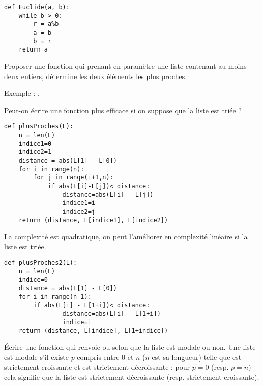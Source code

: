 \begin{Answer}
\begin{lstlisting}
def Euclide(a, b):
    while b > 0:
        r = a%b
        a = b
        b = r
    return a
\end{lstlisting}
\end{Answer}
\begin{Exercise}
Proposer une fonction qui prenant en paramètre une liste contenant au moins deux entiers, détermine les deux éléments les plus proches.  

Exemple : .

Peut-on écrire une fonction plus efficace si on suppose que la liste est triée ?
\end{Exercise}
\begin{Answer}
\begin{lstlisting}
def plusProches(L):
    n = len(L)
    indice1=0
    indice2=1
    distance = abs(L[1] - L[0])
    for i in range(n):
        for j in range(i+1,n):
            if abs(L[i]-L[j])< distance:
                distance=abs(L[i] - L[j])
                indice1=i
                indice2=j
    return (distance, L[indice1], L[indice2])
\end{lstlisting}
    
La complexité est quadratique, on peut l'améliorer en complexité linéaire si la liste est triée.

\begin{lstlisting}
def plusProches2(L):
    n = len(L)
    indice=0
    distance = abs(L[1] - L[0])
    for i in range(n-1):
        if abs(L[i] - L[1+i])< distance:
                distance=abs(L[i] - L[1+i])
                indice=i
    return (distance, L[indice], L[1+indice])
\end{lstlisting}
\end{Answer}
\begin{Exercise}
Écrire une fonction  qui renvoie  ou  selon que la liste est modale ou non. Une liste  est modale s'il existe $p$ compris entre 0 et $n$ ($n$ est sa longueur) telle que  est strictement croissante et  est strictement décroissante ; pour $p=0$ (resp. $p=n$) cela signifie que la liste est strictement décroissante (resp. strictement croissante).
\end{Exercise}
